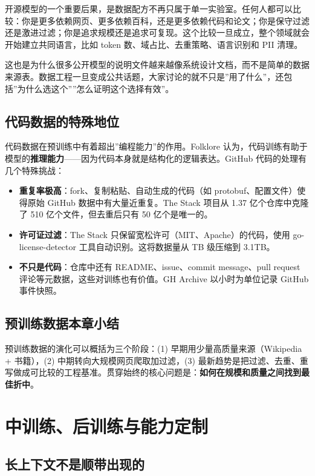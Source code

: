 \documentclass[a4paper]{article}
\begin{document}
开源模型的一个重要后果，是数据配方不再只属于单一实验室。任何人都可以比较：你是更多依赖网页、更多依赖百科，还是更多依赖代码和论文；你是保守过滤还是激进过滤；你是追求规模还是追求可复现。这个比较一旦成立，整个领域就会开始建立共同语言，比如 token 数、域占比、去重策略、语言识别和 PII 清理。

这也是为什么很多公开模型的说明文件越来越像系统设计文档，而不是简单的数据来源表。数据工程一旦变成公共话题，大家讨论的就不只是”用了什么”，还包括”为什么选这个””怎么证明这个选择有效”。

\subsection{代码数据的特殊地位}

代码数据在预训练中有着超出”编程能力”的作用。Folklore 认为，代码训练有助于模型的\textbf{推理能力}——因为代码本身就是结构化的逻辑表达。GitHub 代码的处理有几个特殊挑战：

\begin{itemize}
    \item \textbf{重复率极高}：fork、复制粘贴、自动生成的代码（如 protobuf、配置文件）使得原始 GitHub 数据中有大量近重复。The Stack 项目从 1.37 亿个仓库中克隆了 510 亿个文件，但去重后只有 50 亿个是唯一的。
    \item \textbf{许可证过滤}：The Stack 只保留宽松许可（MIT、Apache）的代码，使用 go-license-detector 工具自动识别。这将数据量从 TB 级压缩到 3.1TB。
    \item \textbf{不只是代码}：仓库中还有 README、issue、commit message、pull request 评论等元数据，这些对训练也有价值。GH Archive 以小时为单位记录 GitHub 事件快照。
\end{itemize}

\subsection{预训练数据本章小结}

预训练数据的演化可以概括为三个阶段：(1) 早期用少量高质量来源（Wikipedia + 书籍），(2) 中期转向大规模网页爬取加过滤，(3) 最新趋势是把过滤、去重、重写做成可比较的工程基准。贯穿始终的核心问题是：\textbf{如何在规模和质量之间找到最佳折中}。

\section{中训练、后训练与能力定制}

\subsection{长上下文不是顺带出现的}
\end{document}

